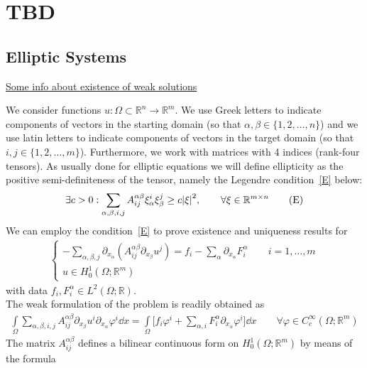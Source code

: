 \chapter{TBD}

\section{Elliptic Systems}

\underline{Some info about existence of weak solutions}

We consider functions \(u: \Omega \subset \mathbb{R}^{n} \to \mathbb{R}^{m}\). We use Greek letters to indicate components of vectors in the starting domain (so that \(\alpha,\beta \in \{1,2,\dots,n\} \)) and we use latin letters to indicate components of vectors in the target domain (so that \(i,j \in \{1,2,\dots,m\} \)). Furthermore, we work with matrices with 4 indices (rank-four tensors). As usually done for elliptic equations we will define ellipticity as the positive semi-definiteness of the tensor, namely the Legendre condition~\eqref{E} below:
\begin{gather}
	\exists c > 0 : \sum_{\alpha,\beta,i,j} A_{ij}^{\alpha\beta} \xi_{\alpha}^{i} \xi_{\beta}^{j} \geq c \abs{\xi}^{2}, \qquad \forall \xi \in \mathbb{R}^{m \times n} \tag{E}\label{E}
\end{gather}
We can employ the condition~\eqref{E} to prove existence and uniqueness results for
\begin{gather}
	\begin{cases}
		- \sum_{\alpha, \beta, j} \partial_{x_\alpha} (A_{ij}^{\alpha \beta} \partial_{x_{\beta}} u^{j}) = f_{i} - \sum_{\alpha}^{} \partial_{x_{\alpha}} F_{i}^{\alpha}\qquad i=1,\dots,m \\
		u \in H_{0}^{1}(\Omega; \mathbb{R}^{m})
	\end{cases} \tag{LS}\label{LS}
\end{gather}
with data \(f_{i},F_{i}^{\alpha} \in L^{2}(\Omega;\mathbb{R})\).\\
The weak formulation of the problem is readily obtained as
\begin{gather}
	\int\limits_{\Omega}^{} \sum_{\alpha, \beta, i,j}^{} A_{ij}^{\alpha \beta} \partial_{x_{\beta}} u^{i} \partial_{x_{\alpha}} \varphi^{i} \dd{x} = \int\limits_{\Omega}^{} \Big[f_{i} \varphi^{i} + \sum_{\alpha,i}^{} F_{i}^{\alpha} \partial_{x_{\alpha}} \varphi^{i} \Big] \dd{x} \qquad \forall \varphi \in C_c^\infty(\Omega;\mathbb{R}^{m})
\end{gather}
The matrix \(A_{ij}^{\alpha \beta}\) defines a bilinear continuous form on \(H_0^1(\Omega;\mathbb{R}^{m})\) by means of the formula
